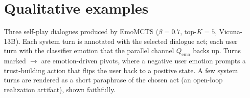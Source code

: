 
%
%


\section{Qualitative examples}\label{app:examples}

Three self-play dialogues produced by EmoMCTS ($\beta{=}0.7$, top-$K{=}5$, Vicuna-13B). Each
system turn is annotated with the selected dialogue act; each user turn with the classifier
emotion that the parallel channel $Q_{\text{emo}}$ backs up. Turns marked $\rightarrow$ are
emotion-driven pivots, where a negative user emotion prompts a trust-building action that flips
the user back to a positive state. A few system turns are rendered as a short paraphrase of the
chosen act (an open-loop realization artifact), shown faithfully.

